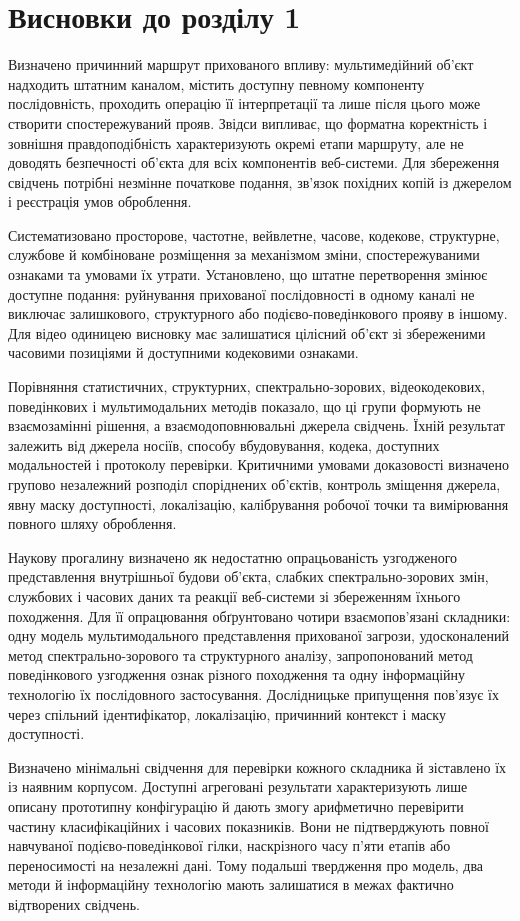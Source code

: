 \section*{Висновки до розділу 1}

Визначено причинний маршрут прихованого впливу: мультимедійний об’єкт надходить штатним каналом, містить доступну певному компоненту послідовність, проходить операцію її інтерпретації та лише після цього може створити спостережуваний прояв. Звідси випливає, що форматна коректність і зовнішня правдоподібність характеризують окремі етапи маршруту, але не доводять безпечності об’єкта для всіх компонентів веб-системи. Для збереження свідчень потрібні незмінне початкове подання, зв’язок похідних копій із джерелом і реєстрація умов оброблення.

Систематизовано просторове, частотне, вейвлетне, часове, кодекове, структурне, службове й комбіноване розміщення за механізмом зміни, спостережуваними ознаками та умовами їх утрати. Установлено, що штатне перетворення змінює доступне подання: руйнування прихованої послідовності в одному каналі не виключає залишкового, структурного або подієво-поведінкового прояву в іншому. Для відео одиницею висновку має залишатися цілісний об’єкт зі збереженими часовими позиціями й доступними кодековими ознаками.

Порівняння статистичних, структурних, спектрально-зорових, відеокодекових, поведінкових і мультимодальних методів показало, що ці групи формують не взаємозамінні рішення, а взаємодоповнювальні джерела свідчень. Їхній результат залежить від джерела носіїв, способу вбудовування, кодека, доступних модальностей і протоколу перевірки. Критичними умовами доказовості визначено групово незалежний розподіл споріднених об’єктів, контроль зміщення джерела, явну маску доступності, локалізацію, калібрування робочої точки та вимірювання повного шляху оброблення.

Наукову прогалину визначено як недостатню опрацьованість узгодженого представлення внутрішньої будови об’єкта, слабких спектрально-зорових змін, службових і часових даних та реакції веб-системи зі збереженням їхнього походження. Для її опрацювання обґрунтовано чотири взаємопов’язані складники: одну модель мультимодального представлення прихованої загрози, удосконалений метод спектрально-зорового та структурного аналізу, запропонований метод поведінкового узгодження ознак різного походження та одну інформаційну технологію їх послідовного застосування. Дослідницьке припущення пов’язує їх через спільний ідентифікатор, локалізацію, причинний контекст і маску доступності.

Визначено мінімальні свідчення для перевірки кожного складника й зіставлено їх із наявним корпусом. Доступні агреговані результати характеризують лише описану прототипну конфігурацію й дають змогу арифметично перевірити частину класифікаційних і часових показників. Вони не підтверджують повної навчуваної подієво-поведінкової гілки, наскрізного часу п’яти етапів або переносимості на незалежні дані. Тому подальші твердження про модель, два методи й інформаційну технологію мають залишатися в межах фактично відтворених свідчень.
